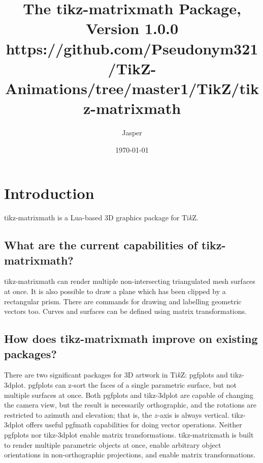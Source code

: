 \documentclass[12pt]{report}
\title{
    The tikz-matrixmath Package,\\
    Version 1.0.0\\
    {\small https://github.com/Pseudonym321/TikZ-Animations/tree/master1/TikZ/tikz-matrixmath}
}
\author{Jasper}
\date{\today}
\begin{document}
    \maketitle 
    \tableofcontents
    \chapter{Introduction}
        tikz-matrixmath is a Lua-based 3D graphics package for 
        Ti\textit{k}Z.
        \section{What are the current capabilities of tikz-matrixmath?}
            tikz-matrixmath can render multiple non-intersecting 
            triangulated mesh surfaces at once. It is also possible 
            to draw a plane which has been clipped by a rectangular
            prism.
            There are commands for drawing and labelling geometric 
            vectors too. Curves and surfaces can be defined using 
            matrix transformations.
        \section{
            How does tikz-matrixmath improve on existing packages?
        }
            There are two significant packages for 3D artwork in 
            Ti\textit{k}Z: pgfplots and tikz-3dplot.
            pgfplots can z-sort the faces of a single parametric 
            surface, but not multiple surfaces at once.
            Both pgfplots and tikz-3dplot are capable of changing 
            the camera view, but the result is necessarily 
            orthographic, and the rotations are restricted to 
            azimuth and elevation; that is, the \(z\)-axis is always 
            vertical. tikz-3dplot offers useful pgfmath capabilities 
            for doing vector operations.
            Neither pgfplots nor tikz-3dplot enable 
            matrix transformations. tikz-matrixmath is built to render 
            multiple parametric objects at once, enable arbitrary
            object orientations in non-orthographic projections, 
            and enable matrix transformations.
\end{document}
